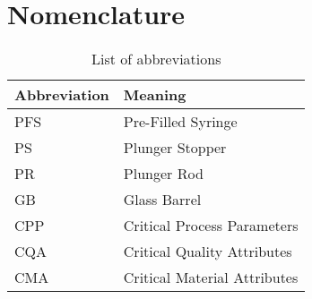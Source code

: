 \section*{Nomenclature}
\label{s:Bezeichnungen}

\begin{table}[!htb]
	\centering
    \def\arraystretch{1.5}
		\begin{tabular}{l p{10cm}}
	 \hline
     Abbreviation & Meaning \\
	  \hline
		PFS & Pre-Filled Syringe \\
		
		PS & Plunger Stopper \\
        
        PR & Plunger Rod \\
        
        GB & Glass Barrel \\
        
        CPP & Critical Process Parameters \\
        
        CQA & Critical Quality Attributes \\
        
        CMA & Critical Material Attributes
		\end{tabular}
	\caption{List of abbreviations}
	\label{tab:bezeichnungen}
\end{table}